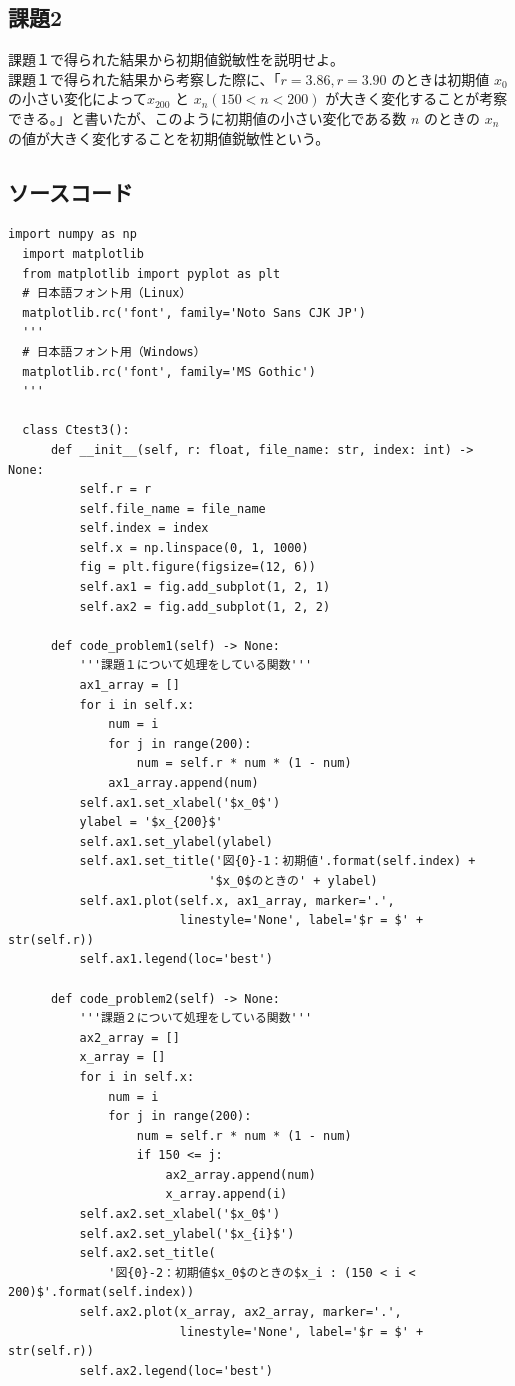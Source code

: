 \subsection{課題2}
課題１で得られた結果から初期値鋭敏性を説明せよ。\\
課題１で得られた結果から考察した際に、「$r = 3.86, r = 3.90$ のときは初期値 $x_0$ の小さい変化によって$x_{200}$ と $x_n (150 < n < 200)$ が大きく変化することが考察できる。」と書いたが、このように初期値の小さい変化である数 $n$ のときの $x_n$ の値が大きく変化することを初期値鋭敏性という。

\subsection{ソースコード}
\begin{lstlisting}[caption=week2.py]
  import numpy as np
  import matplotlib
  from matplotlib import pyplot as plt
  # 日本語フォント用（Linux）
  matplotlib.rc('font', family='Noto Sans CJK JP')
  '''
  # 日本語フォント用（Windows）
  matplotlib.rc('font', family='MS Gothic')
  '''

  class Ctest3():
      def __init__(self, r: float, file_name: str, index: int) -> None:
          self.r = r
          self.file_name = file_name
          self.index = index
          self.x = np.linspace(0, 1, 1000)
          fig = plt.figure(figsize=(12, 6))
          self.ax1 = fig.add_subplot(1, 2, 1)
          self.ax2 = fig.add_subplot(1, 2, 2)

      def code_problem1(self) -> None:
          '''課題１について処理をしている関数'''
          ax1_array = []
          for i in self.x:
              num = i
              for j in range(200):
                  num = self.r * num * (1 - num)
              ax1_array.append(num)
          self.ax1.set_xlabel('$x_0$')
          ylabel = '$x_{200}$'
          self.ax1.set_ylabel(ylabel)
          self.ax1.set_title('図{0}-1：初期値'.format(self.index) +
                            '$x_0$のときの' + ylabel)
          self.ax1.plot(self.x, ax1_array, marker='.',
                        linestyle='None', label='$r = $' + str(self.r))
          self.ax1.legend(loc='best')

      def code_problem2(self) -> None:
          '''課題２について処理をしている関数'''
          ax2_array = []
          x_array = []
          for i in self.x:
              num = i
              for j in range(200):
                  num = self.r * num * (1 - num)
                  if 150 <= j:
                      ax2_array.append(num)
                      x_array.append(i)
          self.ax2.set_xlabel('$x_0$')
          self.ax2.set_ylabel('$x_{i}$')
          self.ax2.set_title(
              '図{0}-2：初期値$x_0$のときの$x_i : (150 < i < 200)$'.format(self.index))
          self.ax2.plot(x_array, ax2_array, marker='.',
                        linestyle='None', label='$r = $' + str(self.r))
          self.ax2.legend(loc='best')


\end{lstlisting}
